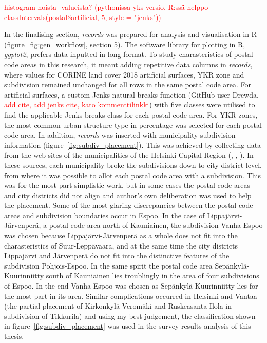 \textcolor{red}{histogram noista -valueista? (pythonissa yks versio, R:ssä helppo classIntervals(postal\$artificial, 5, style = "jenks"))}

In the finalising section, \textit{records} was prepared for analysis and visualisation in R (figure~\ref{fig:gen_workflow}, section 5). The software library for plotting in R, \textit{ggplot2}, prefers data inputted in long format. To study charasteristics of postal code areas in this research, it meant adding repetitive data columns in \textit{records}, where values for CORINE land cover 2018 artificial surfaces, YKR zone and subdivision remained unchanged for all rows in the same postal code area. For artificial surfaces, a custom Jenks natural breaks function (GitHub user Drewda, \textcolor{red}{add cite, add jenks cite, kato kommenttilinkki}) with five classes were utilised to find the applicable Jenks breaks class for each postal code area. For YKR zones, the most common urban structure type in percentage was selected for each postal code area. In addition, \textit{records} was inserted with municipality subdivision information (figure~\ref{fig:subdiv_placement}). This was achieved by collecting data from the web sites of the municipalities of the Helsinki Capital Region (\cite{Espoonkaupunki2020}, \cite{Helsinginkaupunkiymparistontoimiala2019}, \cite{Vantaankaupunki2019}). In these sources, each municipality broke the subdivisions down to city district level, from where it was possible to allot each postal code area with a subdivision. This was for the most part simplistic work, but in some cases the postal code areas and city districts did not align and author's own deliberation was used to help the placement. Some of the most glaring discrepancies between the postal code areas and subdivision boundaries occur in Espoo. In the case of Lippajärvi-Järvenperä, a postal code area north of Kauniainen, the subdivision Vanha-Espoo was chosen because Lippajärvi-Järvenperä as a whole does not fit into the charasteristics of Suur-Leppävaara, and at the same time the city districts Lippajärvi and Järvenperä do not fit into the distinctive features of the subdivision Pohjois-Espoo. In the same spirit the postal code area Sepänkylä-Kuurinniitty south of Kauniainen lies troublingly in the area of four subdivisions of Espoo. In the end Vanha-Espoo was chosen as Sepänkylä-Kuurinniitty lies for the most part in its area. Similar complications occurred in Helsinki and Vantaa (the partial placement of Kirkonkylä-Veromäki and Ruskeasanta-Ilola in subdivision of Tikkurila) and using my best judgement, the classification shown in figure~\ref{fig:subdiv_placement} was used in the survey results analysis of this thesis.


